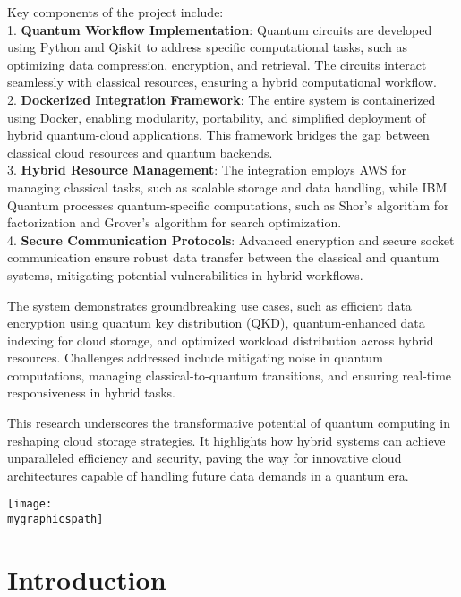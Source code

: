 \documentclass[12pt,a4paper]{article}
\newcommand{\mygraphicspath}{D:/SEM-5/FSDC/quantum-cloud-integration/images/ADYPU_LOGO.png}
\begin{document}
Key components of the project include:  \\
1. \textbf{Quantum Workflow Implementation}: Quantum circuits are developed using Python and Qiskit to address specific computational tasks, such as optimizing data compression, encryption, and retrieval. The circuits interact seamlessly with classical resources, ensuring a hybrid computational workflow.  \\
2. \textbf{Dockerized Integration Framework}: The entire system is containerized using Docker, enabling modularity, portability, and simplified deployment of hybrid quantum-cloud applications. This framework bridges the gap between classical cloud resources and quantum backends.  \\
3. \textbf{Hybrid Resource Management}: The integration employs AWS for managing classical tasks, such as scalable storage and data handling, while IBM Quantum processes quantum-specific computations, such as Shor’s algorithm for factorization and Grover’s algorithm for search optimization.  \\
4. \textbf{Secure Communication Protocols}: Advanced encryption and secure socket communication ensure robust data transfer between the classical and quantum systems, mitigating potential vulnerabilities in hybrid workflows.  

The system demonstrates groundbreaking use cases, such as efficient data encryption using quantum key distribution (QKD), quantum-enhanced data indexing for cloud storage, and optimized workload distribution across hybrid resources. Challenges addressed include mitigating noise in quantum computations, managing classical-to-quantum transitions, and ensuring real-time responsiveness in hybrid tasks.  

This research underscores the transformative potential of quantum computing in reshaping cloud storage strategies. It highlights how hybrid systems can achieve unparalleled efficiency and security, paving the way for innovative cloud architectures capable of handling future data demands in a quantum era.
\newpage


\begin{center}
    \texttt{[image: \\mygraphicspath]}\\[2cm]
    \fontsize{14}{16}\selectfont \bfseries
    \section{Introduction}
    \end{center}
\end{document}
